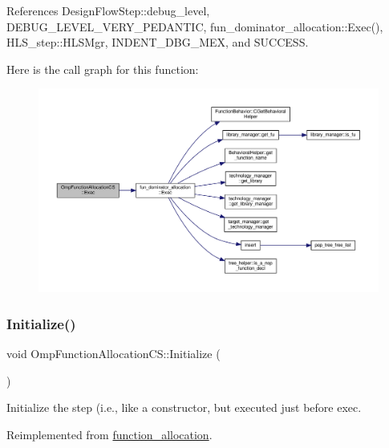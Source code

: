 References Design\+Flow\+Step\+::debug\+\_\+level, D\+E\+B\+U\+G\+\_\+\+L\+E\+V\+E\+L\+\_\+\+V\+E\+R\+Y\+\_\+\+P\+E\+D\+A\+N\+T\+IC, fun\+\_\+dominator\+\_\+allocation\+::\+Exec(), H\+L\+S\+\_\+step\+::\+H\+L\+S\+Mgr, I\+N\+D\+E\+N\+T\+\_\+\+D\+B\+G\+\_\+\+M\+EX, and S\+U\+C\+C\+E\+SS.

Here is the call graph for this function\+:
\nopagebreak
\begin{figure}[H]
\begin{center}
\leavevmode
\includegraphics[width=350pt]{d6/dc2/classOmpFunctionAllocationCS_a2a5a5321bfaefebcca2c4f290bb0d808_cgraph}
\end{center}
\end{figure}
\mbox{\label{classOmpFunctionAllocationCS_a6c97b4f87a09796aa43a387460348315}} 
\subsubsection{\texorpdfstring{Initialize()}{Initialize()}}
{\footnotesize\ttfamily void Omp\+Function\+Allocation\+C\+S\+::\+Initialize (\begin{DoxyParamCaption}{ }\end{DoxyParamCaption})\hspace{0.3cm}{\ttfamily [virtual]}}



Initialize the step (i.\+e., like a constructor, but executed just before exec. 



Reimplemented from \hyperlink{classfunction__allocation_a48d784232dd4383a11ff009a3cd78b30}{function\+\_\+allocation}.



